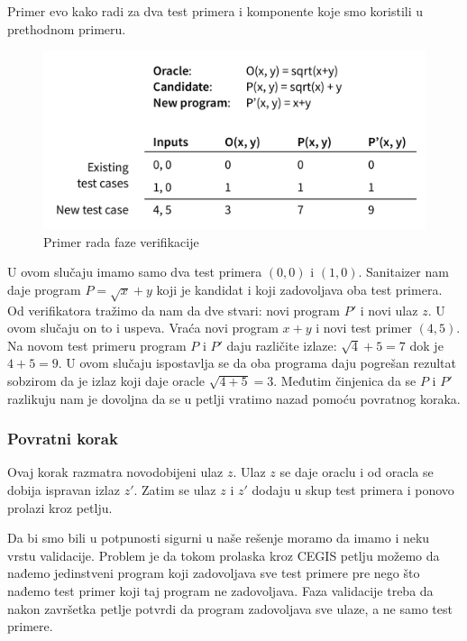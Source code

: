 Primer evo kako radi za dva test primera i komponente koje smo koristili u prethodnom primeru.

\begin{figure}[t]
    \begin{center}
        \includegraphics[scale=0.6]{resources/oracle-table.png}
    \end{center}
    \caption{Primer rada faze verifikacije}
    \label{fig:oraclePrimer1}
\end{figure}

U ovom slučaju imamo samo dva test primera $(0,0)$ i $(1,0)$. Sanitaizer nam daje program $P=\sqrt{x}+y$ koji je kandidat i koji zadovoljava oba test primera. Od verifikatora tražimo da nam da dve stvari: novi program $P'$ i novi ulaz $z$. U ovom slučaju on to i uspeva. Vraća novi program $x+y$ i novi test primer $(4,5)$. Na novom test primeru program $P$ i $P'$ daju različite izlaze: $\sqrt{4}+5=7$ dok je $4+5=9$. U ovom slučaju ispostavlja se da oba programa daju pogrešan rezultat sobzirom da je izlaz koji daje oracle $\sqrt{4+5}=3$. Međutim činjenica da se $P$ i $P'$ razlikuju nam je dovoljna da se u petlji vratimo nazad pomoću povratnog koraka.


\subsubsection{Povratni korak}

Ovaj korak razmatra novodobijeni ulaz $z$. Ulaz $z$ se daje oraclu i od oracla se dobija ispravan izlaz $z'$. Zatim se ulaz $z$ i $z'$ dodaju u skup test primera i ponovo prolazi kroz petlju.

Da bi smo bili u potpunosti sigurni u naše rešenje moramo da imamo i neku vrstu validacije. Problem je da tokom prolaska kroz CEGIS petlju možemo da nađemo jedinstveni program koji zadovoljava sve test primere pre nego što nađemo test primer koji taj program ne zadovoljava. Faza validacije treba da nakon završetka petlje potvrdi da program zadovoljava sve ulaze, a ne samo test primere.


